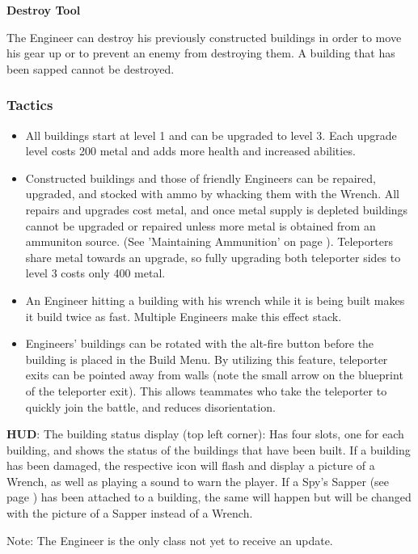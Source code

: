 {\bf Destroy Tool}

 The Engineer can destroy his previously constructed buildings in order to move his gear up or to prevent an enemy from destroying them. A building that has been sapped cannot be destroyed.


\subsubsection {Tactics}
\begin {itemize}

\item All buildings start at level 1 and can be upgraded to level 3.  Each upgrade level costs 200 metal and adds more health and increased abilities.

\item Constructed buildings and those of friendly Engineers can be repaired, upgraded, and stocked with ammo by whacking them with the Wrench.  All repairs and upgrades cost metal, and once metal supply is depleted buildings cannot be upgraded or repaired unless more metal is obtained from an ammuniton source.  (See 'Maintaining Ammunition' on page \pageref{Maintaining_Ammunition}). Teleporters share metal towards an upgrade, so fully upgrading both teleporter sides to level 3 costs only 400 metal.

\item An Engineer hitting a building with his wrench while it is being built makes it build twice as fast. Multiple Engineers make this effect stack.

\item Engineers' buildings can be rotated with the alt-fire button before the building is placed in the Build Menu. By utilizing this feature, teleporter exits can be pointed away from walls (note the small arrow on the blueprint of the teleporter exit). This allows teammates who take the teleporter to quickly join the battle, and reduces disorientation.
\end {itemize}
{\bf HUD}:
The building status display (top left corner): Has four slots, one for each building, and shows the status of the buildings that have been built. If a building has been damaged, the respective icon will  flash and display a picture of a Wrench, as well as playing a sound to warn the player. If a Spy's Sapper (see page \pageref{sapper}) has been attached to a building, the same will happen but will be changed with the picture of a Sapper instead of a Wrench.
 
Note: The Engineer is the only class not yet to receive an update.